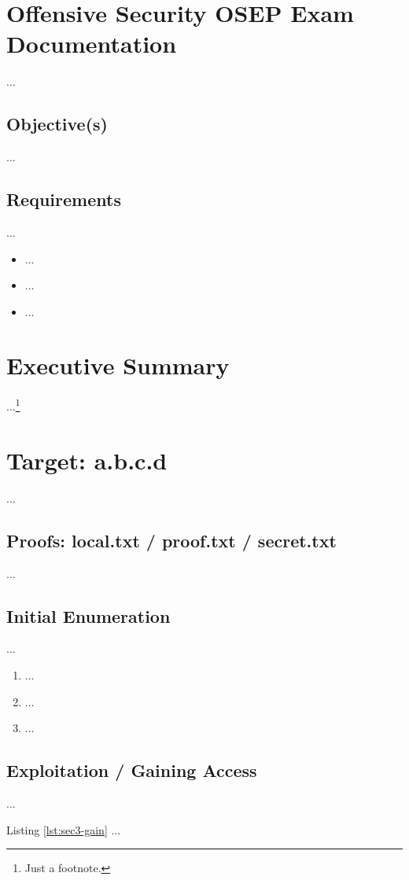 %
%
%
\section{Offensive Security OSEP Exam Documentation}\label{sec:sec1}
%
...
%
%
%
\subsection{Objective(s)}\label{sec:sec1-obj}
%
...
%
%
%
%
\subsection{Requirements}\label{sec:sec1-req}
%
...

\begin{itemize}
    \item ...
    \item ...
    \item ...
\end{itemize}
%
%
%
\section{Executive Summary}\label{sec:sec2}
%
...\footnote{Just a footnote.}
%
%
%
\section{Target: a.b.c.d}\label{sec:sec3}
%
...
\subsection{Proofs: local.txt / proof.txt / secret.txt}\label{sec:sec3-proofs}
%
...
%
%
%
\subsection{Initial Enumeration}\label{sec:sec3-enum1}
%
...

\begin{enumerate}
    \item ...
    \item ...
    \item ...
\end{enumerate}
%
%
%
\subsection{Exploitation / Gaining Access}\label{sec:sec3-gain}
%
...

Listing \ref{lst:sec3-gain} ...\\


